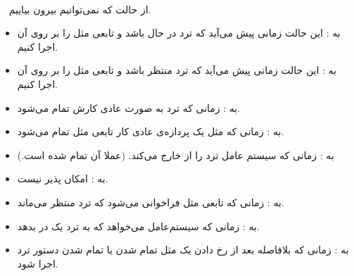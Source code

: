 \\~
از حالت
که نمی‌توانیم بیرون بیاییم.
\begin{itemize}
    \item {} به : این حالت زمانی پیش می‌آید که ترد در حال  باشد و تابعی مثل  را بر روی آن اجرا کنیم.
    \item {} به : این حالت زمانی پیش می‌آید که ترد منتظر  باشد و تابعی مثل  را بر روی آن اجرا کنیم.
    \item {} به : زمانی که ترد به صورت عادی کارش تمام می‌شود.
    \item {} به : زمانی که مثل یک پردازه‌ی عادی کار تابعی مثل  تمام می‌شود.
    \item {} به : زمانی که سیستم عامل ترد را از  خارج می‌کند. (عملا  آن تمام شده است.)
    \item {} به : امکان پذیر نیست.
    \item {} به : زمانی که تابعی مثل  فراخوانی می‌شود که ترد منتظر  می‌ماند.
    \item {} به : زمانی که سیستم‌عامل می‌خواهد که به ترد یک  در  بدهد.
    \item {} به : زمانی که بلافاصله بعد از رخ دادن یک  مثل تمام شدن  یا تمام شدن دستور  ترد اجرا شود.
\end{itemize}